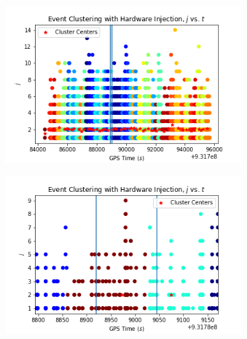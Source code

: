 \documentclass{article}
\begin{document}
\begin{figure}
\begin{subfigure}[t]{0.5\textwidth}
\includegraphics[width=\textwidth]{clusterL1_0.png}
\caption{\label{fig:clusterL1_0}}
\end{subfigure}
\begin{subfigure}[t]{0.5\textwidth}
\includegraphics[width=\textwidth]{clusterzoomL1_0.png}
\caption{\label{fig:clusterzoomL1_0}}
\end{subfigure}


\end{figure}
\end{document}
